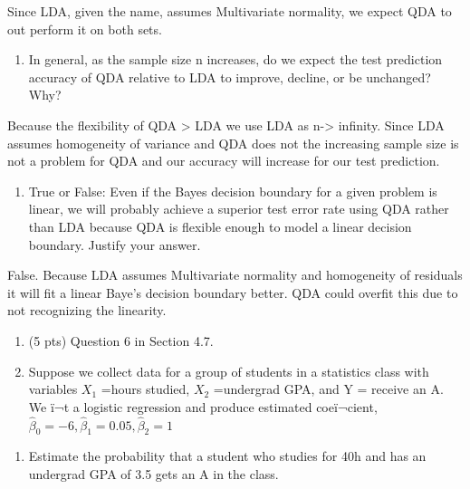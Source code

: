 \documentclass[]{article}
\providecommand{\tightlist}{%
  \setlength{\itemsep}{0pt}\setlength{\parskip}{0pt}}
\begin{document}
Since LDA, given the name, assumes Multivariate normality, we expect QDA
to out perform it on both sets.

\begin{enumerate}
\def\labelenumi{(\alph{enumi})}
\setcounter{enumi}{2}
\tightlist
\item
  In general, as the sample size n increases, do we expect the test
  prediction accuracy of QDA relative to LDA to improve, decline, or be
  unchanged? Why?
\end{enumerate}

Because the flexibility of QDA \textgreater{} LDA we use LDA as
n-\textgreater{} infinity. Since LDA assumes homogeneity of variance and
QDA does not the increasing sample size is not a problem for QDA and our
accuracy will increase for our test prediction.

\begin{enumerate}
\def\labelenumi{(\alph{enumi})}
\setcounter{enumi}{3}
\tightlist
\item
  True or False: Even if the Bayes decision boundary for a given problem
  is linear, we will probably achieve a superior test error rate using
  QDA rather than LDA because QDA is flexible enough to model a linear
  decision boundary. Justify your answer.
\end{enumerate}

False. Because LDA assumes Multivariate normality and homogeneity of
residuals it will fit a linear Baye's decision boundary better. QDA
could overfit this due to not recognizing the linearity.

\begin{enumerate}
\def\labelenumi{\arabic{enumi}.}
\setcounter{enumi}{4}
\item
  (5 pts) Question 6 in Section 4.7.
\item
  Suppose we collect data for a group of students in a statistics class
  with variables \(X_1\) =hours studied, \(X_2\) =undergrad GPA, and Y =
  receive an A. We ï¬t a logistic regression and produce estimated
  coeï¬cient,
  \(\hat{\beta}_{0}=-6, \hat{\beta}_{1}=0.05, \hat{\beta}_{2}=1\)
\end{enumerate}

\begin{enumerate}
\def\labelenumi{(\alph{enumi})}
\tightlist
\item
  Estimate the probability that a student who studies for 40h and has an
  undergrad GPA of 3.5 gets an A in the class.
\end{enumerate}
\end{document}
